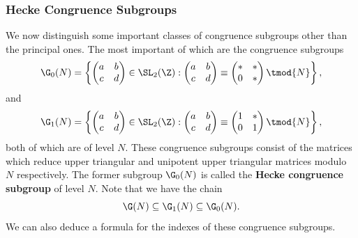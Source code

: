 \documentclass[12pt]{article}
\begin{document}
      \subsubsection*{Hecke Congruence Subgroups}
        We now distinguish some important classes of congruence subgroups other than the principal ones. The most important of which are the congruence subgroups
        \[
          \G_{0}(N) = \left\{\begin{pmatrix} a & b \\ c & d \end{pmatrix} \in \SL_{2}(\Z):\begin{pmatrix} a & b \\ c & d \end{pmatrix} \equiv \begin{pmatrix} \ast & \ast \\ 0 & \ast \end{pmatrix} \tmod{N}\right\},
        \]
        and
        \[
          \G_{1}(N) = \left\{\begin{pmatrix} a & b \\ c & d \end{pmatrix} \in \SL_{2}(\Z):\begin{pmatrix} a & b \\ c & d \end{pmatrix} \equiv \begin{pmatrix} 1 & \ast \\ 0 & 1 \end{pmatrix} \tmod{N}\right\},
        \]
        both of which are of level \(N\). These congruence subgroups consist of the matrices which reduce upper triangular and unipotent upper triangular matrices modulo \(N\) respectively. The former subgroup \(\G_{0}(N)\) is called the \textbf{Hecke congruence subgroup} of level \(N\). Note that we have the chain
        \[
          \G(N) \subseteq \G_{1}(N) \subseteq \G_{0}(N).
        \]
        We can also deduce a formula for the indexes of these congruence subgroups.
\end{document}
